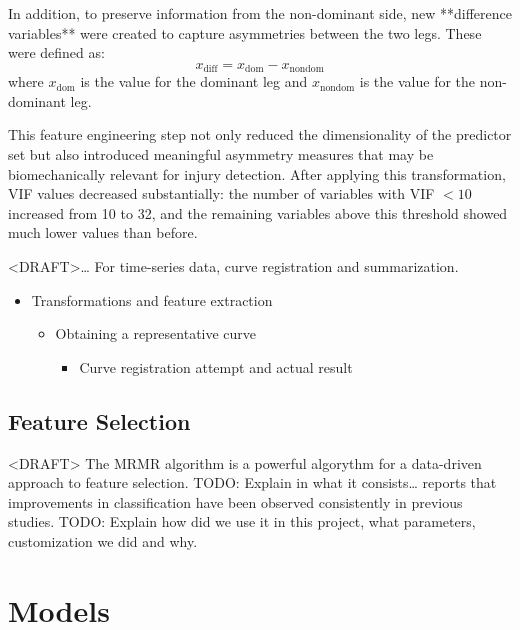 In addition, to preserve information from the non-dominant side, new **difference variables** were created to capture asymmetries between the two legs. These were defined as:  
\begin{equation}
    x_{\mathrm{diff}} = x_{\mathrm{dom}} - x_{\mathrm{nondom}}
\end{equation}
where $x_{\mathrm{dom}}$ is the value for the dominant leg and $x_{\mathrm{nondom}}$ is the value for the non-dominant leg.  

This feature engineering step not only reduced the dimensionality of the predictor set but also introduced meaningful asymmetry measures that may be biomechanically relevant for injury detection. After applying this transformation, VIF values decreased substantially: the number of variables with VIF $< 10$ increased from 10 to 32, and the remaining variables above this threshold showed much lower values than before.  



<DRAFT>\dots
For time-series data, curve registration and summarization.

\begin{itemize}
    \item Transformations and feature extraction
    \begin{itemize}
        \item Obtaining a representative curve
        \begin{itemize}
        \item Curve registration attempt and actual result
        \end{itemize}
    \end{itemize}
\end{itemize}


\subsection{Feature Selection}\label{subsec:method-feature-selection}
<DRAFT>
The MRMR algorithm \citep{DING2005} is a powerful algorythm for a data-driven approach to feature selection.
TODO: Explain in what it consists\dots
\citet{Phinyomark2017} reports that improvements in classification have been observed consistently in previous studies.
TODO: Explain how did we use it in this project, what parameters, customization we did and why.

\section{Models}\label{sec:method-models}
